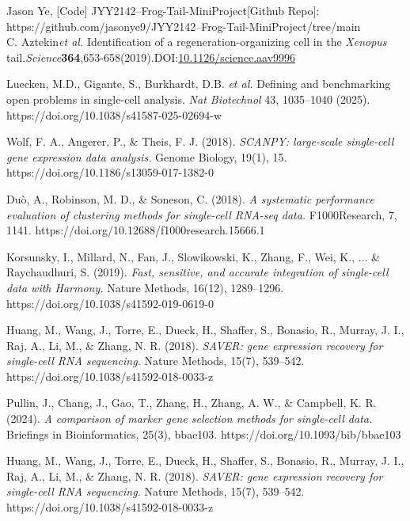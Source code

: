 \documentclass[11pt]{article}
\begin{document}
\begin{thebibliography}{9}

Jason Ye, [Code] JYY2142--Frog-Tail-MiniProject[Github Repo]: https://github.com/jasonye9/JYY2142--Frog-Tail-MiniProject/tree/main\\

C. Aztekin\textit{et al.} Identification of a regeneration-organizing cell in the \textit{Xenopus} tail.\textit{Science}\textbf{364},653-658(2019).DOI:\href{https://doi.org/10.1126/science.aav9996}{10.1126/science.aav9996}

Luecken, M.D., Gigante, S., Burkhardt, D.B. \textit{et al.} Defining and benchmarking open problems in single-cell analysis. \textit{Nat Biotechnol} 43, 1035–1040 (2025). https://doi.org/10.1038/s41587-025-02694-w

Wolf, F. A., Angerer, P., \& Theis, F. J. (2018). \textit{SCANPY: large-scale single-cell gene expression data analysis.} Genome Biology, 19(1), 15.
https://doi.org/10.1186/s13059-017-1382-0

Duò, A., Robinson, M. D., \& Soneson, C. (2018). \textit{A systematic performance evaluation of clustering methods for single-cell RNA-seq data.} F1000Research, 7, 1141.
https://doi.org/10.12688/f1000research.15666.1

Korsunsky, I., Millard, N., Fan, J., Slowikowski, K., Zhang, F., Wei, K., ... \& Raychaudhuri, S. (2019). \textit{Fast, sensitive, and accurate integration of single-cell data with Harmony.} Nature Methods, 16(12), 1289–1296.
https://doi.org/10.1038/s41592-019-0619-0

Huang, M., Wang, J., Torre, E., Dueck, H., Shaffer, S., Bonasio, R., Murray, J. I., Raj, A., Li, M., \& Zhang, N. R. (2018). \textit{SAVER: gene expression recovery for single-cell RNA sequencing.} Nature Methods, 15(7), 539–542.
https://doi.org/10.1038/s41592-018-0033-z

Pullin, J., Chang, J., Gao, T., Zhang, H., Zhang, A. W., \& Campbell, K. R. (2024). \textit{A comparison of marker gene selection methods for single-cell data.} Briefings in Bioinformatics, 25(3), bbae103.
https://doi.org/10.1093/bib/bbae103

Huang, M., Wang, J., Torre, E., Dueck, H., Shaffer, S., Bonasio, R., Murray, J. I., Raj, A., Li, M., \& Zhang, N. R. (2018). \textit{SAVER: gene expression recovery for single-cell RNA sequencing.} Nature Methods, 15(7), 539–542.
https://doi.org/10.1038/s41592-018-0033-z

\end{thebibliography}
\end{document}
